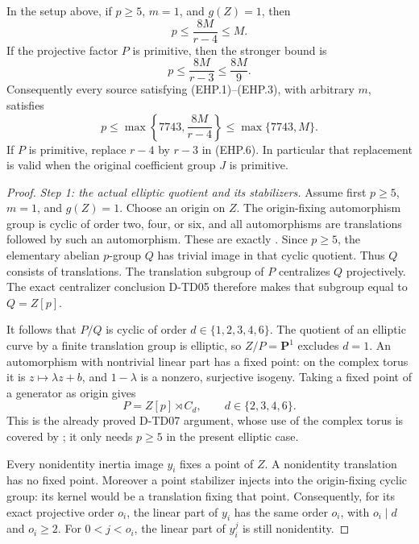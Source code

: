 \begin{theorem}[D-TD55]
In the setup above, if \(p\ge5\), \(m=1\), and \(g(Z)=1\), then
\[
 p\le\frac{8M}{r-4}\le M.
 \tag{EHP.4}
\]
If the projective factor \(P\) is primitive, then the stronger bound is
\[
 p\le\frac{8M}{r-3}\le\frac{8M}{9}.
 \tag{EHP.5}
\]
Consequently every source satisfying (EHP.1)--(EHP.3), with arbitrary
\(m\), satisfies
\[
 p\le\max\!\left\{7743,\frac{8M}{r-4}\right\}
       \le\max\{7743,M\}.
 \tag{EHP.6}
\]
If \(P\) is primitive, replace \(r-4\) by \(r-3\) in (EHP.6).
In particular that replacement is valid when the original coefficient
group \(J\) is primitive.
\end{theorem}

\begin{proof}
\emph{Step 1: the actual elliptic quotient and its stabilizers.}
Assume first \(p\ge5\), \(m=1\), and \(g(Z)=1\).  Choose an origin on
\(Z\).  The origin-fixing automorphism group is cyclic of order two,
four, or six, and all automorphisms are translations followed by such
an automorphism.  These are exactly
\cite[Chapter IV, Proposition 7.13 and Remark 7.18, pp.~140--141]{TD:MilneEC2021}.
Since \(p\ge5\), the elementary abelian \(p\)-group \(Q\) has trivial
image in that cyclic quotient.  Thus \(Q\) consists of translations.
The translation subgroup of \(P\) centralizes \(Q\) projectively.
The exact centralizer conclusion D-TD05 therefore makes that subgroup
equal to \(Q=Z[p]\).

It follows that \(P/Q\) is cyclic of order \(d\in\{1,2,3,4,6\}\).
The quotient of an elliptic curve by a finite translation group is
elliptic, so \(Z/P=\mathbf P^1\) excludes \(d=1\).  An automorphism
with nontrivial linear part has a fixed point: on the complex torus
it is \(z\mapsto\lambda z+b\), and \(1-\lambda\) is a nonzero,
surjective isogeny.  Taking a fixed point of a generator as origin
gives
\[
                 P=Z[p]\rtimes C_d,\qquad d\in\{2,3,4,6\}.
 \tag{EHP.7}
\]
This is the already proved D-TD07 argument, whose use of the complex
torus is covered by
\cite[Chapter III, Proposition 3.3 and Theorem 3.10,
pp.~94, 96]{TD:MilneEC2021}; it only needs \(p\ge5\) in the present
elliptic case.

Every nonidentity inertia image \(y_i\) fixes a point of \(Z\).
A nonidentity translation has no fixed point.  Moreover a point
stabilizer injects into the origin-fixing cyclic group: its kernel
would be a translation fixing that point.  Consequently, for its
exact projective order \(o_i\), the linear part of \(y_i\) has the
same order \(o_i\), with \(o_i\mid d\) and \(o_i\ge2\).
For \(0<j<o_i\), the linear part of \(y_i^j\) is still nonidentity.


\end{proof}
